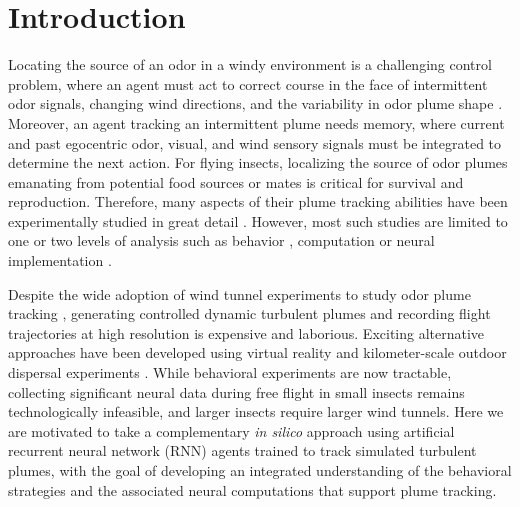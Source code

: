 \documentclass[5p,twocolumn,authoryear]{elsarticle}
\begin{document}
\section*{Introduction}
Locating the source of an odor in a windy environment is a challenging control problem, where an agent must act to correct course in the face of intermittent odor signals, changing wind directions, and the variability in odor plume shape \citep{reddyannrev,celani2014odor}.
Moreover, an agent tracking an intermittent plume needs memory, where current and past egocentric 
odor, visual, and wind sensory signals must be integrated to determine the next action.
For flying insects, localizing the source of odor plumes emanating from potential food sources or mates is critical for survival and reproduction.
Therefore, many aspects of their plume tracking abilities have been experimentally studied in great detail \citep{baker2018algorithms, park2016neurally, carde2008navigational,currier2020multisensory}.
However, most such studies are limited to one or two levels of analysis such as behavior \citep{van2008insects}, computation \citep{lochmatter2009theoretical,pang2018history} or neural implementation \citep{sun2018analysis}.

Despite the wide adoption of wind tunnel experiments to study odor plume tracking \citep{van2014plume}, generating controlled dynamic turbulent plumes and recording flight trajectories at high resolution is expensive and laborious.
Exciting alternative approaches have been developed using virtual reality \citep{kaushik2020characterizing}
and kilometer-scale outdoor dispersal experiments \citep{leitch2020long}. 
While behavioral experiments are now tractable, collecting significant neural data during free flight in small insects remains technologically infeasible, and larger insects require larger wind tunnels.
Here we are motivated to take a complementary \textit{in silico} approach using artificial recurrent neural network (RNN) agents trained to track simulated turbulent plumes, with the goal of developing an integrated understanding of the behavioral strategies and the associated neural computations that support plume tracking.
\end{document}
